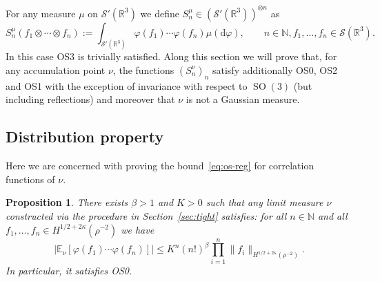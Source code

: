 \documentclass[a4paper,11pt]{article}
\newcommand{\assign}{:=}
\newcommand{\mathd}{\mathrm{d}}
\newcommand{\tmop}[1]{\ensuremath{\operatorname{#1}}}
\newtheorem{proposition}[theorem]{Proposition}
\numberwithin{equation}{section}
\begin{document}
For any measure $\mu$ on $\mathcal{S}' (\mathbb{R}^3)$ we define $S_n^{\mu}
\in (\mathcal{S}' (\mathbb{R}^3))^{\otimes n}$ as
\[ S_n^{\mu} (f_1 \otimes \cdots \otimes f_n) \assign \int_{\mathcal{S}'
   (\mathbb{R}^3)} \varphi (f_1) \cdots \varphi (f_n) \mu (\mathd \varphi),
   \qquad n\in \mathbb{N}, f_1, \ldots, f_n \in \mathcal{S} (\mathbb{R}^3) . \]
In this case OS3 is trivially satisfied. 
Along this section we will prove
that, for any accumulation point $\nu$, the functions $(S^{\nu}_n)_n$ satisfy
additionally OS0, OS2 and OS1 with the exception of invariance with respect to $\tmop{SO}
(3)$ (but including reflections) and moreover that $\nu$  is not a Gaussian measure.

\subsection{Distribution property}
\label{ss:OS0}

Here we are concerned with proving the bound~{\eqref{eq:os-reg}} for
correlation functions of $\nu$.

\begin{proposition}
  \label{prop:os-reg-bound}There exists $\beta > 1$ and $K > 0$ such that  any limit measure $\nu$ constructed via the procedure in Section~\ref{sec:tight} satisfies: for
  all $n \in\mathbb{N}$ and all $f_1, \ldots, f_n \in H^{1 / 2 +2 \kappa}
  (\rho^{- 2})$ we have
  \[ | \mathbb{E}_{\nu} [\varphi (f_1) \cdots \varphi (f_n)] | \leqslant K^n
     (n!)^{\beta} \prod_{i = 1}^n \| f_i \|_{H^{1 / 2 +2 \kappa} (\rho^{- 2})}
     . \]
     In particular, it satisfies {\em OS0}.
\end{proposition}
\end{document}
